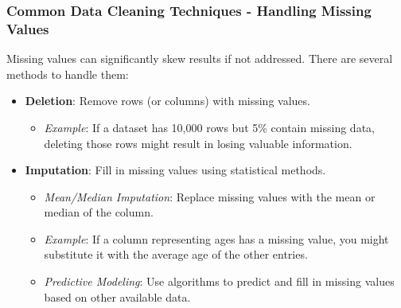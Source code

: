 \documentclass[aspectratio=169]{beamer}
\begin{document}
\begin{frame}[fragile]
    \frametitle{Common Data Cleaning Techniques - Handling Missing Values}
    Missing values can significantly skew results if not addressed. There are several methods to handle them:
    \begin{itemize}
        \item \textbf{Deletion}: Remove rows (or columns) with missing values.
            \begin{itemize}
                \item \textit{Example}: If a dataset has 10,000 rows but 5\% contain missing data, deleting those rows might result in losing valuable information.
            \end{itemize}
        \item \textbf{Imputation}: Fill in missing values using statistical methods.
            \begin{itemize}
                \item \textit{Mean/Median Imputation}: Replace missing values with the mean or median of the column.
                \item \textit{Example}: If a column representing ages has a missing value, you might substitute it with the average age of the other entries.
                \item \textit{Predictive Modeling}: Use algorithms to predict and fill in missing values based on other available data.
            \end{itemize}
    \end{itemize}
\end{frame}
\end{document}
